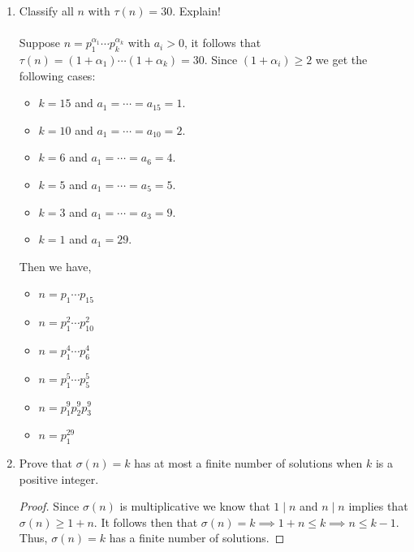 \documentclass[class=article, crop=false]{standalone}
\begin{document}
\begin{enumerate}
\item
  Classify all $n$ with $\tau(n)=30$. Explain! \\\\
  Suppose $n = p_1^{\alpha_1} \cdots p_k^{\alpha_k}$ with $a_i > 0$, it follows that
  $\tau(n) = (1+\alpha_1) \cdots (1+\alpha_k)=30$. Since $(1+\alpha_i) \geq 2$ we get
  the following cases:
  \begin{itemize}
	\item $k=15$ and $a_1 = \cdots = a_{15} = 1$.
	\item $k=10$ and $a_1 = \cdots = a_{10} = 2$.
	\item $k=6$ and $a_1 = \cdots = a_{6} = 4$.
	\item $k=5$ and $a_1 = \cdots = a_{5} = 5$.
	\item $k=3$ and $a_1 = \cdots = a_{3} = 9$.
	\item $k=1$ and $a_1 = 29$.
  \end{itemize}
  Then we have,
  \begin{itemize}
	\item $n=p_1\cdots p_{15}$
	\item $n=p_1^2\cdots p_{10}^2$
	\item $n=p_1^4\cdots p_{6}^4$
	\item $n=p_1^5\cdots p_{5}^5$
	\item $n=p_1^9 p_2^9 p_3^9$
	\item $n=p_1^{29}$
  \end{itemize}

\item
  Prove that $\sigma(n)=k$
  has at most a finite number of solutions when $k$ is a positive integer.
  \begin{proof}
	Since $\sigma(n)$ is multiplicative we know that $1\mid n$ and $n\mid n$ implies that
	$\sigma(n) \geq 1+n$. It follows then that $\sigma(n)=k \implies 1+n\leq k \implies n\leq k-1$.
	Thus, $\sigma(n)=k$ has a finite number of solutions.
  \end{proof}


\end{enumerate}
\end{document}
